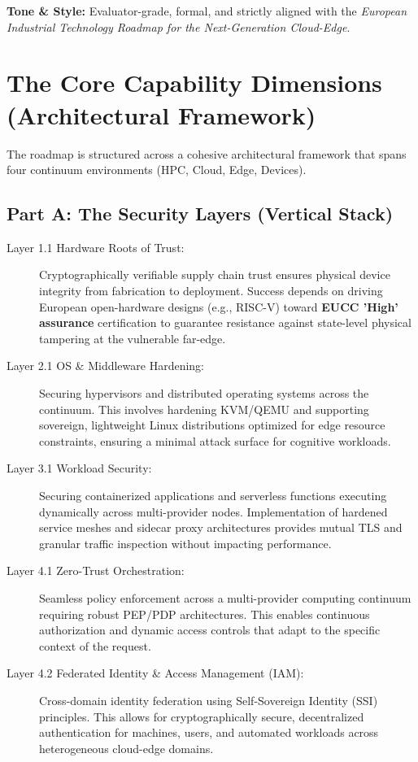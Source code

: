 \documentclass{ieeeaccess}
\begin{document}
\noindent\textbf{Tone \& Style:} Evaluator-grade, formal, and strictly aligned with the \textit{European Industrial Technology Roadmap for the Next-Generation Cloud-Edge}.


\section{The Core Capability Dimensions (Architectural Framework)}
The roadmap is structured across a cohesive architectural framework that spans four continuum environments (HPC, Cloud, Edge, Devices).

\subsection*{Part A: The Security Layers (Vertical Stack)}
\begin{description}
\item[Layer 1.1 Hardware Roots of Trust:] Cryptographically verifiable supply chain trust ensures physical device integrity from fabrication to deployment. Success depends on driving European open-hardware designs (e.g., RISC-V) toward \textbf{EUCC 'High' assurance} certification \cite{eucc} to guarantee resistance against state-level physical tampering at the vulnerable far-edge.

\item[Layer 2.1 OS \& Middleware Hardening:] Securing hypervisors and distributed operating systems across the continuum. This involves hardening KVM/QEMU and supporting sovereign, lightweight Linux distributions optimized for edge resource constraints, ensuring a minimal attack surface for cognitive workloads.

\item[Layer 3.1 Workload Security:] Securing containerized applications and serverless functions executing dynamically across multi-provider nodes. Implementation of hardened service meshes and sidecar proxy architectures provides mutual TLS and granular traffic inspection without impacting performance.

\item[Layer 4.1 Zero-Trust Orchestration:] Seamless policy enforcement across a multi-provider computing continuum requiring robust PEP/PDP architectures. This enables continuous authorization and dynamic access controls that adapt to the specific context of the request.

\item[Layer 4.2 Federated Identity \& Access Management (IAM):] Cross-domain identity federation using Self-Sovereign Identity (SSI) principles. This allows for cryptographically secure, decentralized authentication for machines, users, and automated workloads across heterogeneous cloud-edge domains.


\end{description}
\end{document}
